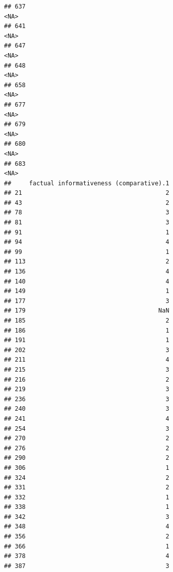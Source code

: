 \documentclass[
]{article}
\begin{document}
\begin{verbatim}
## 637                                                                         <NA>
## 641                                                                         <NA>
## 647                                                                         <NA>
## 648                                                                         <NA>
## 658                                                                         <NA>
## 677                                                                         <NA>
## 679                                                                         <NA>
## 680                                                                         <NA>
## 683                                                                         <NA>
##     factual informativeness (comparative).1
## 21                                        2
## 43                                        2
## 78                                        3
## 81                                        3
## 91                                        1
## 94                                        4
## 99                                        1
## 113                                       2
## 136                                       4
## 140                                       4
## 149                                       1
## 177                                       3
## 179                                     NaN
## 185                                       2
## 186                                       1
## 191                                       1
## 202                                       3
## 211                                       4
## 215                                       3
## 216                                       2
## 219                                       3
## 236                                       3
## 240                                       3
## 241                                       4
## 254                                       3
## 270                                       2
## 276                                       2
## 290                                       2
## 306                                       1
## 324                                       2
## 331                                       2
## 332                                       1
## 338                                       1
## 342                                       3
## 348                                       4
## 356                                       2
## 366                                       1
## 378                                       4
## 387                                       3

\end{verbatim}
\end{document}

